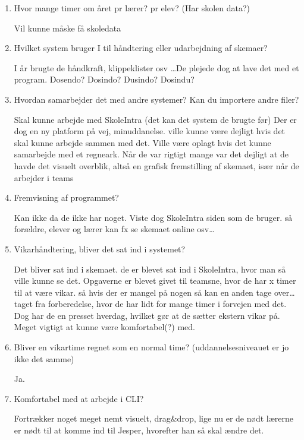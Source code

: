 \begin{enumerate}
	\item Hvor mange timer om året pr lærer? pr elev? (Har skolen data?)
	
	Vil kunne måske få skoledata
	
	\item Hvilket system bruger I til håndtering eller udarbejdning af skemaer?

	I år brugte de håndkraft, klippeklister osv \ldots De plejede dog at lave det med et program. Dosendo? Dosindo? Dusindo? Dosindu? 
	
	\item Hvordan samarbejder det med andre systemer? Kan du importere andre filer?
	
	Skal kunne arbejde med SkoleIntra (det kan det system de brugte før) Der er dog en ny platform på vej, minuddanelse. ville kunne være dejligt hvis det skal kunne arbejde sammen med det. Ville være oplagt hvis det kunne samarbejde med et regneark. Når de var rigtigt mange var det dejligt at de havde det visuelt overblik, altså en grafisk fremstilling af skemaet, især når de arbejder i teams
	
	\item Fremvisning af programmet?
	
	Kan ikke da de ikke har noget. Viste dog SkoleIntra siden som de bruger. så forældre, elever og lærer kan fx se skemaet online osv\ldots 
	
	\item Vikarhåndtering, bliver det sat ind i systemet?
	
	Det bliver sat ind i skemaet. de er blevet sat ind i SkoleIntra, hvor man så ville kunne se det. Opgaverne er blevet givet til teamsne, hvor de har x timer til at være vikar. så hvis der er mangel på nogen så kan en anden tage over\ldots taget fra forberedelse, hvor de har lidt for mange timer i forvejen med det. Dog har de en presset hverdag, hvilket gør at de sætter ekstern vikar på. Meget vigtigt at kunne være komfortabel(?) med. 
	
	\item Bliver en vikartime regnet som en normal time? (uddannelsesniveauet er jo ikke det samme)
	
	Ja.
	
	\item Komfortabel med at arbejde i CLI?
	
	Fortrækker noget meget nemt visuelt, drag\&drop, lige nu er de nødt lærerne er nødt til at komme ind til Jesper, hvorefter han så skal ændre det.
	

\end{enumerate}
